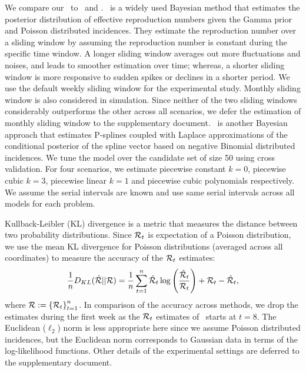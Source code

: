We compare our \RtEstim\ to \EpiEstim\ and \EpiLPS. \EpiEstim\ is a widely used Bayesian method that estimates the posterior distribution of effective reproduction numbers given the Gamma prior and Poisson distributed incidences. They estimate the reproduction number over a sliding window by assuming the reproduction number is constant during the specific time window. A longer sliding window averages out more fluctuations and noises, and leads to smoother estimation over time; whereas, a shorter sliding window is more responsive to sudden spikes or declines in a shorter period. We use the default weekly sliding window for the experimental study. Monthly sliding window is also considered in simulation. Since neither of the two sliding windows considerably outperforms the other across all scenarios, we defer the estimation of monthly sliding window to the supplementary document. 
\EpiLPS\ is another Bayesian approach that estimates P-splines coupled with Laplace approximations of the conditional posterior of the spline vector based on negative Binomial distributed incidences. 
We tune the model over the candidate set of size 50 using cross validation. For four scenarios, we estimate piecewise constant $k=0$, piecewise cubic $k=3$, piecewise linear $k=1$ and piecewise cubic polynomials respectively. 
We assume the serial intervals are known and use same serial intervals across all models for each problem. 

Kullback-Leibler (KL) divergence is a metric that measures the distance between two probability distributions. Since $\mathcal{R}_t$ is expectation of a Poisson distribution, we use the mean KL divergence for Poisson distributions (averaged across all coordinates) to measure the accuracy of the $\mathcal{R}_t$ estimates: 
$$\frac{1}{n} D_{KL}(\hat{\mathcal{R}}|| \mathcal{R}) = \frac{1}{n}\sum_{t=1}^n \hat{\mathcal{R}}_t \log\left(\frac{\hat{\mathcal{R}}_t}{\mathcal{R}_t}\right) + {\mathcal{R}}_t - \hat{\mathcal{R}}_t,$$ 
where $\mathcal{R} := \left\{ \mathcal{R}_t \right\}_{t=1}^n$. %
In comparison of the accuracy across methods, we drop the estimates during the first week as the $\mathcal{R}_t$ estimates of \EpiEstim\ starts at $t=8$.  
The Euclidean ($\ell_2$) norm is less appropriate here since we assume Poisson distributed incidences, but the Euclidean norm corresponds to Gaussian data in terms of the log-likelihood functions. 
Other details of the experimental settings are deferred to the supplementary document. 

